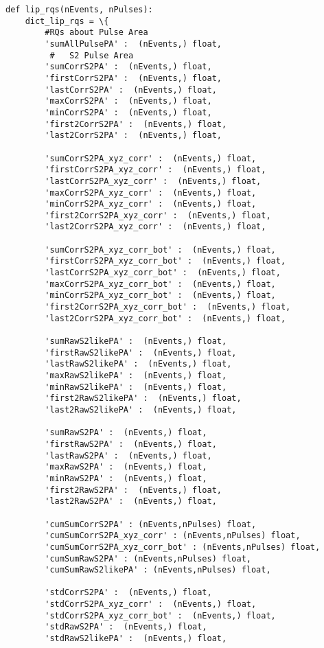 \begin{verbatim}
def lip_rqs(nEvents, nPulses):
    dict_lip_rqs = \{
        #RQs about Pulse Area
        'sumAllPulsePA' :  (nEvents,) float,
         #   S2 Pulse Area
        'sumCorrS2PA' :  (nEvents,) float, 
        'firstCorrS2PA' :  (nEvents,) float,
        'lastCorrS2PA' :  (nEvents,) float,
        'maxCorrS2PA' :  (nEvents,) float,
        'minCorrS2PA' :  (nEvents,) float,
        'first2CorrS2PA' :  (nEvents,) float,
        'last2CorrS2PA' :  (nEvents,) float,
        
        'sumCorrS2PA_xyz_corr' :  (nEvents,) float, 
        'firstCorrS2PA_xyz_corr' :  (nEvents,) float,
        'lastCorrS2PA_xyz_corr' :  (nEvents,) float,
        'maxCorrS2PA_xyz_corr' :  (nEvents,) float,
        'minCorrS2PA_xyz_corr' :  (nEvents,) float,
        'first2CorrS2PA_xyz_corr' :  (nEvents,) float,
        'last2CorrS2PA_xyz_corr' :  (nEvents,) float,
        
        'sumCorrS2PA_xyz_corr_bot' :  (nEvents,) float, 
        'firstCorrS2PA_xyz_corr_bot' :  (nEvents,) float,
        'lastCorrS2PA_xyz_corr_bot' :  (nEvents,) float,
        'maxCorrS2PA_xyz_corr_bot' :  (nEvents,) float,
        'minCorrS2PA_xyz_corr_bot' :  (nEvents,) float,
        'first2CorrS2PA_xyz_corr_bot' :  (nEvents,) float,
        'last2CorrS2PA_xyz_corr_bot' :  (nEvents,) float,
        
        'sumRawS2likePA' :  (nEvents,) float, 
        'firstRawS2likePA' :  (nEvents,) float,
        'lastRawS2likePA' :  (nEvents,) float,
        'maxRawS2likePA' :  (nEvents,) float,
        'minRawS2likePA' :  (nEvents,) float,
        'first2RawS2likePA' :  (nEvents,) float,
        'last2RawS2likePA' :  (nEvents,) float,
        
        'sumRawS2PA' :  (nEvents,) float, 
        'firstRawS2PA' :  (nEvents,) float,
        'lastRawS2PA' :  (nEvents,) float,
        'maxRawS2PA' :  (nEvents,) float,
        'minRawS2PA' :  (nEvents,) float,
        'first2RawS2PA' :  (nEvents,) float,
        'last2RawS2PA' :  (nEvents,) float,
        
        'cumSumCorrS2PA' : (nEvents,nPulses) float,
        'cumSumCorrS2PA_xyz_corr' : (nEvents,nPulses) float,
        'cumSumCorrS2PA_xyz_corr_bot' : (nEvents,nPulses) float,
        'cumSumRawS2PA' : (nEvents,nPulses) float,
        'cumSumRawS2likePA' : (nEvents,nPulses) float,
        
        'stdCorrS2PA' :  (nEvents,) float,
        'stdCorrS2PA_xyz_corr' :  (nEvents,) float,
        'stdCorrS2PA_xyz_corr_bot' :  (nEvents,) float,
        'stdRawS2PA' :  (nEvents,) float,
        'stdRawS2likePA' :  (nEvents,) float,
        

\end{verbatim}
